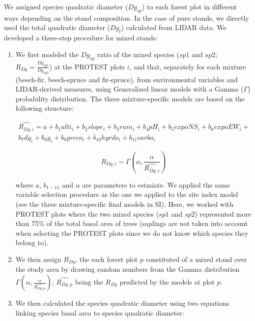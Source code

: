 \documentclass[a4paper]{article}
\begin{document}
We assigned species quadratic diameter ($Dg_{sp}$) to each forest plot in different ways depending on the stand composition. In the case of pure stands, we directly used the total quadratic diameter ($Dg_t$) calculated from LIDAR data. We developed a three-step procedure for mixed stands:

\begin{enumerate}

  \item We first modeled the $Dg_{sp}$ ratio of the mixed species ($sp1$ and $sp2$; $R_{Dg} = \frac{Dg_{sp1}}{Dg_{sp2}}$) at the PROTEST plots $i$, and that, separately for each mixture (beech-fir, beech-spruce and fir-spruce), from environmental variables and LIDAR-derived measures, using Generalized linear models with a Gamma ($\Gamma$) probability distribution. The three mixture-specific models are based on the following structure:

  \begin{multline}\label{gfir-spruce}
    \widehat{R_{Dg, i}} = a + b_1 alti_i + b_2 slope_i + b_3 rum_i + b_4 pH_i + b_5 expoNS_i + b_6 expoEW_i + \\ b_7 dg_i + b_8 g_i + b_9 greco_i + b_{10} hyrdo_i + b_{11} carbo_i
  \end{multline}

  \begin{equation}\label{si}
    R_{Dg, i} \sim \Gamma(\alpha, \frac{\alpha}{\widehat{R_{Dg, i}}})
  \end{equation}

  where $a$, $b_{1-11}$ and $\alpha$ are parameters to estmiate. We applied the same variable selection procedure as the one we applied to the site index model (see the three mixture-specific final models in SI). Here, we worked with PROTEST plots where the two mixed species ($sp1$ and $sp2$) represented more than 75\% of the total basal area of trees (saplings are not taken into account when selecting the PROTEST plots since we do not know which species they belong to).

  \item We then assign $R_{Dg}$, the each forest plot $p$ constituted of a mixed stand over the study area by drawing random numbers from the Gamma distribution $\Gamma(\alpha, \frac{\alpha}{\widehat{R_{Dg, p}}})$, $\widehat{R_{Dg, p}}$ being the $R_{Dg}$ predicted by the models at plot $p$.

  \item We then calculated the species quadratic diameter using two equations linking species basal area to species quadratic diameter:


\end{enumerate}
\end{document}
